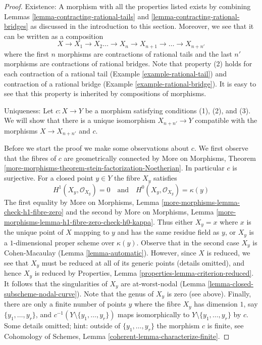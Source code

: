 \documentclass{stacks-project}
\theoremstyle{plain}
\theoremstyle{definition}
\theoremstyle{remark}
\numberwithin{equation}{subsection}
\begin{document}
\begin{proof}
Existence: A morphism with all the properties listed exists by
combining Lemmas \ref{lemma-contracting-rational-tails} and
\ref{lemma-contracting-rational-bridges} as discussed in the
introduction to this section.
Moreover, we see that it can be written as a composition
$$
X \to X_1 \to X_2 \ldots \to X_n \to X_{n + 1} \to \ldots \to X_{n + n'}
$$
where the first $n$ morphisms are contractions of rational tails
and the last $n'$ morphisms are contractions of rational bridges.
Note that property (2) holds for each contraction of a rational
tail (Example \ref{example-rational-tail}) and contraction of a
rational bridge (Example \ref{example-rational-bridge}).
It is easy to see that this property is inherited by compositions of morphisms.

\medskip\noindent
Uniqueness: Let $c : X \to Y$ be a morphism satisfying conditions
(1), (2), and (3). We will show that there is a unique isomorphism
$X_{n + n'} \to Y$ compatible with the morphisms $X \to X_{n + n'}$ and $c$.

\medskip\noindent
Before we start the proof we make some observations about $c$.
We first observe that the fibres of $c$ are geometrically connected by
More on Morphisms, Theorem
\ref{more-morphisms-theorem-stein-factorization-Noetherian}.
In particular $c$ is surjective.
For a closed point $y \in Y$ the fibre $X_y$ satisfies
$$
H^1(X_y, \mathcal{O}_{X_y}) = 0
\quad\text{and}\quad
H^0(X_y, \mathcal{O}_{X_y}) = \kappa(y)
$$
The first equality by More on Morphisms, Lemma
\ref{more-morphisms-lemma-check-h1-fibre-zero}
and the second by More on Morphisms, Lemma
\ref{more-morphisms-lemma-h1-fibre-zero-check-h0-kappa}.
Thus either $X_y = x$ where $x$ is the unique point of $X$ mapping to
$y$ and has the same residue field as $y$, or $X_y$ is a $1$-dimensional
proper scheme over $\kappa(y)$. Observe that in the second case
$X_y$ is Cohen-Macaulay (Lemma \ref{lemma-automatic}).
However, since $X$ is reduced, we see that $X_y$ must be reduced
at all of its generic points (details omitted), and hence $X_y$
is reduced by Properties, Lemma \ref{properties-lemma-criterion-reduced}.
It follows that the singularities of $X_y$ are at-worst-nodal
(Lemma \ref{lemma-closed-subscheme-nodal-curve}).
Note that the genus of $X_y$ is zero (see above).
Finally, there are only a finite number of points $y$ where
the fibre $X_y$ has dimension $1$, say
$\{y_1, \ldots, y_r\}$, and $c^{-1}(Y \setminus \{y_1, \ldots, y_r\})$
maps isomorphically to $Y \setminus \{y_1, \ldots, y_r\}$ by $c$.
Some details omitted; hint: outside of $\{y_1, \ldots, y_r\}$
the morphism $c$ is finite, see
Cohomology of Schemes, Lemma \ref{coherent-lemma-characterize-finite}.


\end{proof}
\end{document}
